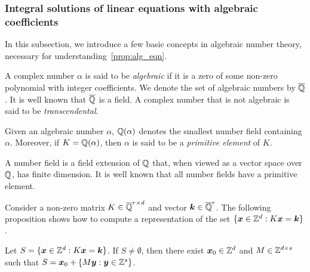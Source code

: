 \subsubsection{Integral solutions of linear equations with algebraic coefficients}
\label{sec:ant}

In this subsection, we introduce a few basic concepts in algebraic number theory, necessary for understanding~\cref{prop:alg_eqn}.

A complex number $\alpha$ is said to be \emph{algebraic} if it is a zero of some non-zero polynomial with integer coefficients. We denote the set of algebraic numbers by $\overline{\mathbb{Q}}$. It is well known that $\overline{\mathbb{Q}}$ is a field. A complex number that is not algebraic is said to be \emph{transcendental}.

Given an algebraic number $\alpha$, $\mathbb{Q}(\alpha)$ denotes the smallest number field containing $\alpha$. Moreover, if $K=\mathbb{Q}(\alpha)$, then $\alpha$ is said to be a \emph{primitive element} of $K$.

A number field is a field extension of $\mathbb{Q}$ that, when viewed as a vector space over $\mathbb{Q}$, has finite dimension.
It is well known that all number fields have a primitive element.

Consider a non-zero matrix $K\in\overline{\mathbb{Q}}^{r\times d}$ and vector $\boldsymbol{k} \in \overline{\mathbb{Q}}^r$.  The following proposition shows how to compute a representation of the set $\lbrace \boldsymbol{x} \in \mathbb{Z}^{d} : K\boldsymbol{x} = \boldsymbol{k} \rbrace$.

\begin{proposition}
    \label{prop:alg_eqn}
  Let $S = \lbrace \boldsymbol{x}\in\mathbb{Z}^{d} : K\boldsymbol{x} =
  \boldsymbol{k} \rbrace$. If $S \neq \emptyset$, then there exist
  $\boldsymbol{x}_{0} \in \mathbb{Z}^{d}$ and $M \in \mathbb{Z}^{d \times s}$ such that
  $S = \boldsymbol{x}_{0} + \lbrace M \boldsymbol{y} : \boldsymbol{y} \in \mathbb{Z}^s \rbrace$.
\end{proposition}

